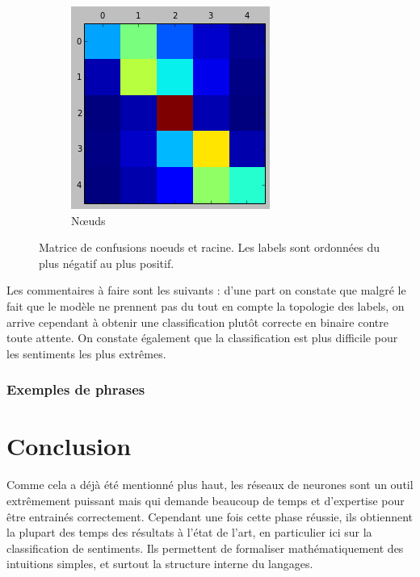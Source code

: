 \documentclass[conference]{IEEEtran}
\begin{document}
\begin{figure}[h]
\begin{subfigure}{0.48\columnwidth}
\includegraphics[width=\textwidth]{fig/CMLastTrain.png}
\caption{Nœuds}
\end{subfigure}
\caption{Matrice de confusions noeuds et racine. Les labels sont ordonnées du plus négatif au plus positif.}
\label{CM1}
\end{figure}

Les commentaires à faire sont les suivants : d'une part on constate que malgré le fait que le modèle ne prennent pas du tout en compte la topologie des labels, on arrive cependant à obtenir une classification plutôt correcte en binaire contre toute attente. On constate également que la classification est plus difficile pour les sentiments les plus extrêmes.



\subsubsection{Exemples de phrases}


\section{Conclusion}
Comme cela a déjà été mentionné plus haut, les réseaux de neurones sont un outil extrêmement puissant mais qui demande beaucoup de temps et d'expertise pour être entrainés correctement. Cependant une fois cette phase réussie, ils obtiennent la plupart des temps des résultats à l'état de l'art, en particulier ici sur la classification de sentiments. Ils permettent de formaliser mathématiquement des intuitions simples, et surtout la structure interne du langages.
\end{document}
